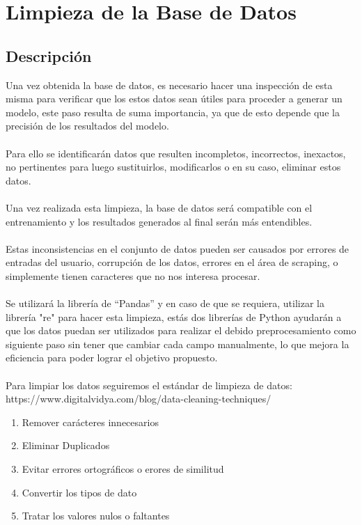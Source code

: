 \documentclass[12pt, a4paper, titlepage]{report}
\begin{document}
		
\newpage

	
\section{Limpieza de la Base de Datos} %
		\subsection{Descripción}
		Una vez obtenida la base de datos, es necesario hacer una inspección de esta misma para verificar que los estos datos sean útiles para proceder a generar un modelo, este paso resulta de suma importancia, ya que de esto depende que la precisión de los resultados del modelo.\\\\
		Para ello se identificarán datos que resulten incompletos, incorrectos, inexactos, no pertinentes para
		luego sustituirlos, modificarlos o en su caso, eliminar estos datos.\\\\
		Una vez realizada esta limpieza, la base de datos será compatible con el entrenamiento y los resultados generados al final serán más entendibles.\\\\
		Estas inconsistencias en el conjunto de datos pueden ser causados por errores de entradas del usuario, corrupción de los datos, errores en el área de scraping, o simplemente tienen caracteres que no nos interesa procesar.\\\\
		
		Se utilizará la librería de “Pandas” y en caso de que se requiera, utilizar la librería "re" para hacer esta limpieza, estás dos librerías de Python ayudarán a que los datos puedan ser utilizados para realizar el debido preprocesamiento como siguiente paso sin tener que cambiar cada campo manualmente, lo que mejora la eficiencia para poder lograr el objetivo propuesto.\\\\
		Para limpiar los datos seguiremos el estándar de limpieza de datos: https://www.digitalvidya.com/blog/data-cleaning-techniques/
		\begin{enumerate}
			\item Remover carácteres innecesarios
			\item Eliminar Duplicados
			\item Evitar errores ortográficos o erores de similitud
			\item Convertir los tipos de dato
			\item Tratar los valores nulos o faltantes
		\end{enumerate}
		\newpage
\end{document}
